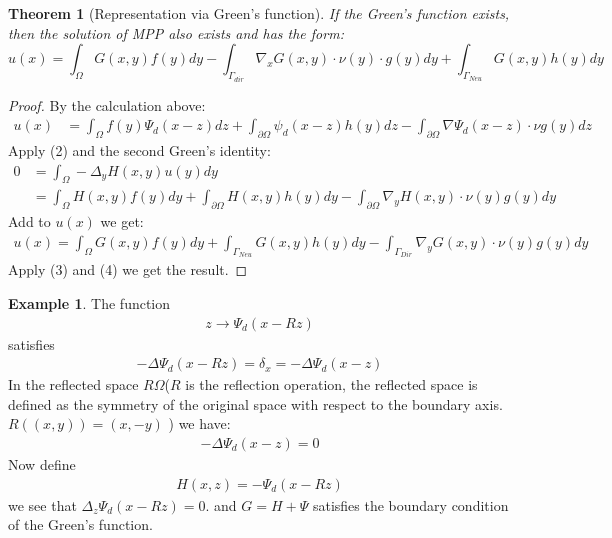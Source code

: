 \documentclass[a4paper,11pt,oneside,fleqn]{book}
\newtheorem{theorem}{Theorem}[section]
\theoremstyle{definition}
\newtheorem*{example}{Example}
\theoremstyle{remark}
\begin{document}
\begin{theorem}[Representation via Green's function]
	If the Green's function exists, then the solution of MPP also exists and has the form:
	\begin{equation}\label{PE: Green's formula}
		u(x) = \int_\Omega G(x, y)f(y)dy - \int_{\Gamma_{dir}}\nabla_x G(x, y)\cdot \nu(y) \cdot  g(y) dy + \int_{\Gamma_{Neu}} G(x,y) h(y)dy
	\end{equation}
\end{theorem}
\begin{proof}
	By the calculation above:
	\begin{align*}
		u(x) &= \int_\Omega f(y) \Psi_d(x-z)dz 
		+ \int_{\partial \Omega} \psi_d(x-z)h(y) dz 
		- \int_{\partial \Omega}\nabla\Psi_d(x-z) \cdot \nu g(y) dz
	\end{align*}
	Apply (2) and the second Green's identity:
	\begin{align*}
		0 &= \int_{\Omega} -\Delta_y H(x, y) u(y) dy \\
		&= \int_{\Omega} H(x, y) f(y) dy 
		  + \int_{\partial \Omega} H(x, y) h(y) dy
		  - \int_{\partial \Omega} \nabla_y H(x, y) \cdot \nu(y) g(y) dy
	\end{align*}
	Add to $u(x)$ we get:
	\begin{align*}
		u(x) = \int_{\Omega} G(x, y) f(y)dy
				+\int_{\Gamma_{Neu}} G(x,y)h(y)dy
				 - \int_{\Gamma_{Dir}}\nabla_y G(x, y)\cdot \nu(y) g(y)dy
	\end{align*}
	Apply (3) and (4) we get the result.
\end{proof}

\begin{example}
	The function 
	\begin{align*}
		z \rightarrow \Psi_d(x - Rz)
	\end{align*}
	satisfies
	\begin{align*}
		-\Delta \Psi_d (x -Rz) = \delta_x = -\Delta \Psi_d(x -z)
	\end{align*}
	In the reflected space $R\Omega$($R$ is the reflection operation, the reflected space is defined as the symmetry of the original space with respect to the boundary axis. $R((x, y)) = (x, -y)$ ) we have:
	\begin{align*}
		-\Delta \Psi_d(x - z) = 0
	\end{align*}
	Now define
	\begin{align*}
		H(x, z) = -\Psi_d(x - Rz)
	\end{align*}
	we see that $\Delta_z \Psi_d(x - Rz) = 0$. and $G = H +\Psi$ satisfies the boundary condition of the Green's function. 
\end{example}
\end{document}
